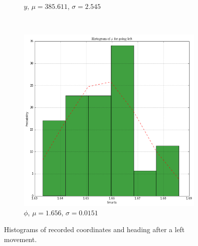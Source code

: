 \documentclass[paper=a4, fontsize=11pt]{scrartcl} %
\begin{document}
\begin{figure}[h!]
\begin{subfigure}[b]{0.3\textwidth}
        \caption{$y$, $\mu = 385.611$, $\sigma = 2.545$}
    \end{subfigure}
    ~
    \begin{subfigure}[b]{0.3\textwidth}
        \setlength{\fboxsep}{0.5pt} %
        \setlength{\fboxrule}{0.5pt}
        \includegraphics[width=\textwidth,fbox]{images/histogram_4_phi_left.png}
        \caption{$\phi$, $\mu = 1.656$, $\sigma = 0.0151$}
    \end{subfigure}
    \caption{Histograms of recorded coordinates and heading after a left movement.}
\end{figure}

\newpage
\end{document}
